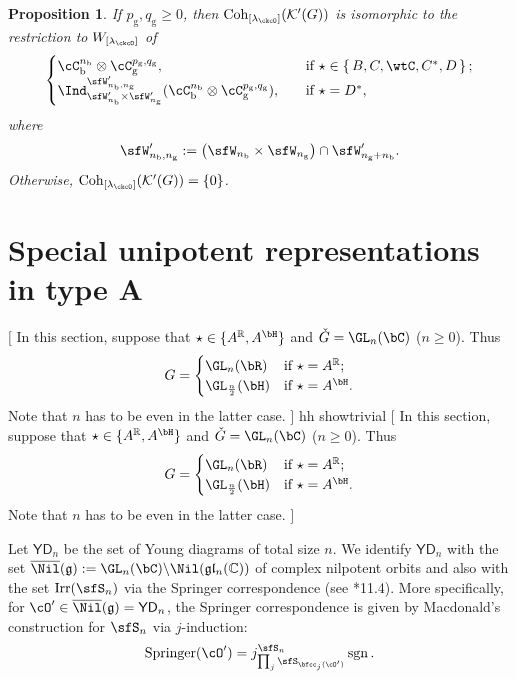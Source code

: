 \documentclass[12pt,a4paper]{amsart}
\newcommand{\trivial}[2][]{\if\relax\detokenize{#1}\relax
  {%
      \color{orange} \vspace{0em} $[$  #2 $]$
      \color{black}
  }
  \else
\ifx#1h
\ifcsname showtrivial\endcsname
{%
    \color{orange} \vspace{0em}  $[$ #2 $]$
    \color{black}
}
\fi
\else {\red Wrong argument!} \fi
\fi
}
\newcommand{\CK}{{\mathcal {K}}}
\newcommand{\CO}{{\mathcal {O}}}
\newcommand{\sgn}{\operatorname{sgn}}
\newcommand{\g}{\mathfrak g}
\renewcommand{\l}{\mathfrak l}
\newcommand{\R}{\mathbb R}
\numberwithin{equation}{section}
\newtheorem{prop}[thm]{Proposition}
\theoremstyle{remark}
\def\Irr{\mathrm{Irr}}
\def\ckG{\check{G}}
\def\YD{\mathsf{YD}}
\def\lamck{\lambda_\ckcO}
\def\Coh{\mathrm{Coh}}
\def\Spr{\mathrm{Springer}}
\begin{document}
\begin{prop}\label{prop:cohBCD44}
 If  $p_\mathrm g, q_\mathrm g\geq 0$, then $\Coh_{[\lamck]}(\CK'(G))$ is isomorphic to the restriction to $W_{[\lamck]}$ of
  \[
    \begin{cases}
      \cC_{\mathrm b}^{n_{\mathrm b}}\otimes\cC_{\mathrm g}^{p_{\mathrm g},q_{\mathrm g}}, &\quad \text{if } \star \in \set{B,C,\wtC,C^{*},D};\\
      \Ind_{\sfW'_{n_{\mathrm b}}\times \sfW'_{n_{\mathrm g}}}^{\sfW_{n_{\mathrm b},n_{\mathrm g}}'}(\cC_{\mathrm b}^{n_{\mathrm b}}\otimes\cC_{\mathrm g}^{p_{\mathrm g},q_{\mathrm g}}), &\quad \text{if } \star = D^{*}, \\
    \end{cases}
  \]
  where
  \[
    \sfW_{n_{\mathrm b},n_{\mathrm g}}' := \left(\sfW_{n_{\mathrm b}}\times \sfW_{n_{\mathrm g}}\right)\cap \sfW'_{n_{\mathrm g}+n_{\mathrm b}}.%
  \]
  Otherwise, $\Coh_{[\lamck]}(\CK'(G))=\{0\}$.
\end{prop}



\section{Special unipotent representations in type A}\label{sec:GL}





\trivial[h]{In this section, suppose that $\star\in \{A^\R, A^\bH\}$ and $\ckG = \GL_{n}(\bC)$  ($n\geq 0$). Thus
\[
  G= \begin{cases}
    \GL_{n}(\bR)  & \text{if } \star=A^\R; \\
    \GL_{\frac{n}{2}}(\bH) & \text{if } \star =A^\bH. \\
  \end{cases}
\]
Note that $n$ has to be even in the latter case.
}


 Let $\YD_{n}$ be the set of Young diagrams of total size $n$.
We identify $\YD_{n}$ with the set $\overline{\Nil}(\g):= \GL_{n}(\bC)\backslash \Nil(\g\l_n(\C))$ of complex nilpotent orbits and
also with the set  $\Irr(\sfS_{n})$ via the Springer
correspondence (see \cite{Carter}*{11.4}).
More specifically, for $ \cO' \in \overline \Nil( \g)=\YD_{n}$, the Springer
correspondence is given by Macdonald's construction for $\sfS_{n}$ via $j$-induction:
\[
  \Spr( \cO') = j_{\prod_{j}\sfS_{\bfcc_{j}(\cO')}}^{\sfS_{n}} \sgn.
\]
\end{document}

